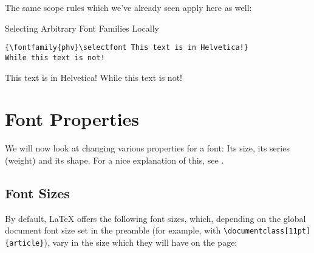 \documentclass[a4paper,oneside,11pt]{article}
\newcommand\code[1]{\texttt{#1}}
\begin{document}
The same scope rules which we've already seen apply here as well:

\begin{titled-frame}
{\textsf{Selecting Arbitrary Font Families Locally}}
\vspace{-1em}
\begin{verbatim}
{\fontfamily{phv}\selectfont This text is in Helvetica!}
While this text is not!
\end{verbatim}
{\selectfont This text is in Helvetica!} While this text is not!
\end{titled-frame}


\section{Font Properties}
\label{sec:font-props}

We  will  now look  at  changing  various  properties  for a  font: Its  size,
its  series (weight)  and  its  shape. For a  nice  explanation  of this,  see
\cite{stackexch:bfseries-textbf}.


\subsection{Font Sizes}
\label{subsec:font-sizes}

By  default, \LaTeX{}  offers the  following font  sizes, which,  depending on
the  global  document  font  size  set in  the  preamble  (for  example,  with
\code{\textbackslash{}documentclass[11pt]\{article\}}), vary in the size which
they will have on the page:
\end{document}
